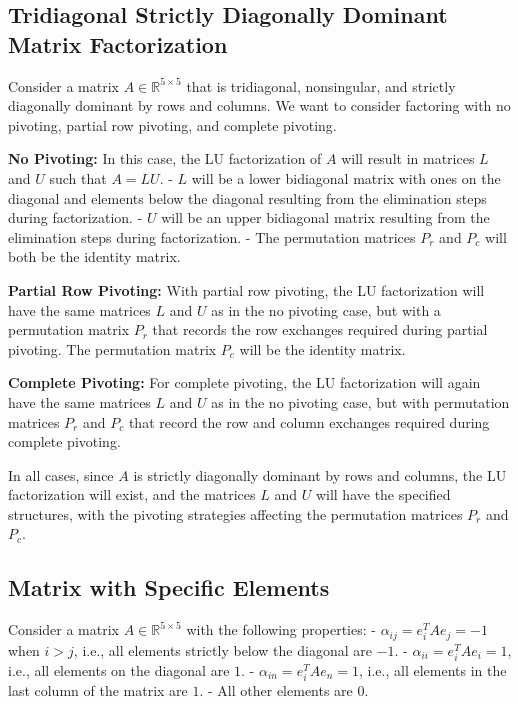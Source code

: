 \documentclass{article}
\begin{document}
\subsection{Tridiagonal Strictly Diagonally Dominant Matrix Factorization}
Consider a matrix \( A \in \mathbb{R}^{5 \times 5} \) that is tridiagonal, nonsingular, and strictly diagonally dominant by rows and columns. We want to consider factoring with no pivoting, partial row pivoting, and complete pivoting.

\textbf{No Pivoting:}
In this case, the LU factorization of \( A \) will result in matrices \( L \) and \( U \) such that \( A = LU \).
- \( L \) will be a lower bidiagonal matrix with ones on the diagonal and elements below the diagonal resulting from the elimination steps during factorization.
- \( U \) will be an upper bidiagonal matrix resulting from the elimination steps during factorization.
- The permutation matrices \( P_r \) and \( P_c \) will both be the identity matrix.

\textbf{Partial Row Pivoting:}
With partial row pivoting, the LU factorization will have the same matrices \( L \) and \( U \) as in the no pivoting case, but with a permutation matrix \( P_r \) that records the row exchanges required during partial pivoting. The permutation matrix \( P_c \) will be the identity matrix.

\textbf{Complete Pivoting:}
For complete pivoting, the LU factorization will again have the same matrices \( L \) and \( U \) as in the no pivoting case, but with permutation matrices \( P_r \) and \( P_c \) that record the row and column exchanges required during complete pivoting.

In all cases, since \( A \) is strictly diagonally dominant by rows and columns, the LU factorization will exist, and the matrices \( L \) and \( U \) will have the specified structures, with the pivoting strategies affecting the permutation matrices \( P_r \) and \( P_c \).

\subsection{Matrix with Specific Elements}
Consider a matrix \( A \in \mathbb{R}^{5 \times 5} \) with the following properties:
- \( \alpha_{ij} = e_i^T A e_j = -1 \) when \( i > j \), i.e., all elements strictly below the diagonal are \( -1 \).
- \( \alpha_{ii} = e_i^T A e_i = 1 \), i.e., all elements on the diagonal are \( 1 \).
- \( \alpha_{in} = e_i^T A e_n = 1 \), i.e., all elements in the last column of the matrix are \( 1 \).
- All other elements are \( 0 \).
\end{document}
